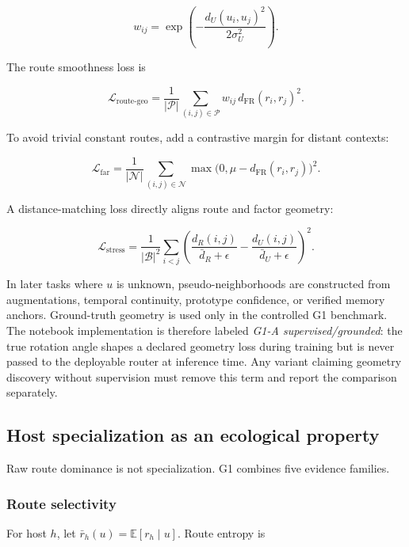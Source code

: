 \documentclass[11pt,a4paper]{article}
\newcommand{\E}{\mathbb{E}}
\newcommand{\loss}{\mathcal{L}}
\begin{document}
\begin{equation}
 w_{ij}=\exp\left(-\frac{d_U(u_i,u_j)^2}{2\sigma_U^2}\right).
\end{equation}

The route smoothness loss is

\begin{equation}
 \loss_{\mathrm{route\text{-}geo}}=
 \frac{1}{|\mathcal{P}|}\sum_{(i,j)\in\mathcal{P}}w_{ij}\,d_{\mathrm{FR}}(r_i,r_j)^2.
\end{equation}

To avoid trivial constant routes, add a contrastive margin for distant contexts:

\begin{equation}
 \loss_{\mathrm{far}}=
 \frac{1}{|\mathcal{N}|}\sum_{(i,j)\in\mathcal{N}}
 \max\bigl(0,\mu-d_{\mathrm{FR}}(r_i,r_j)\bigr)^2.
\end{equation}

A distance-matching loss directly aligns route and factor geometry:

\begin{equation}
 \loss_{\mathrm{stress}}=\frac{1}{|\mathcal{B}|^2}\sum_{i<j}
 \left(\frac{d_R(i,j)}{\bar d_R+\epsilon}-\frac{d_U(i,j)}{\bar d_U+\epsilon}\right)^2.
\end{equation}

In later tasks where \(u\) is unknown, pseudo-neighborhoods are constructed from augmentations, temporal continuity, prototype confidence, or verified memory anchors. Ground-truth geometry is used only in the controlled G1 benchmark. The notebook implementation is therefore labeled \emph{G1-A supervised/grounded}: the true rotation angle shapes a declared geometry loss during training but is never passed to the deployable router at inference time. Any variant claiming geometry discovery without supervision must remove this term and report the comparison separately.

\subsection{Host specialization as an ecological property}

Raw route dominance is not specialization. G1 combines five evidence families.

\subsubsection{Route selectivity}

For host \(h\), let \(\bar r_h(u)=\E[r_h\mid u]\). Route entropy is
\end{document}
